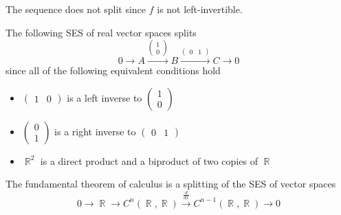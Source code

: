 \begin{example}
\begin{thmenum}
    The sequence does not split since \( f \) is not left-invertible.

     The following SES of real vector spaces splits
    \begin{equation*}
      0
      \longrightarrow
      A
      \overset {\left(\begin{smallmatrix}1 \\ 0\end{smallmatrix}\right)} \longrightarrow
      B
      \overset {\left(\begin{smallmatrix}0 & 1\end{smallmatrix}\right)} \longrightarrow
      C
      \longrightarrow
      0
    \end{equation*}
    since all of the following equivalent conditions hold
    \begin{itemize}
      \item \( \left(\begin{smallmatrix}1 & 0\end{smallmatrix}\right) \) is a left inverse to \( \left(\begin{smallmatrix}1 \\ 0\end{smallmatrix}\right) \)
      \item \( \left(\begin{smallmatrix}0 \\ 1\end{smallmatrix}\right) \) is a right inverse to \( \left(\begin{smallmatrix}0 & 1\end{smallmatrix}\right) \)
      \item \( \BbbR^2 \) is a direct product and a biproduct of two copies of \( \BbbR \)
    \end{itemize}

     The fundamental theorem of calculus is a splitting of the SES of vector spaces
    \begin{equation*}
      0
      \longrightarrow
      \BbbR
      \longrightarrow
      C^n(\BbbR, \BbbR)
      \overset {\frac d {dx}} \longrightarrow
      C^{n-1}(\BbbR, \BbbR)
      \longrightarrow
      0
    \end{equation*}
  \end{thmenum}
\end{example}

